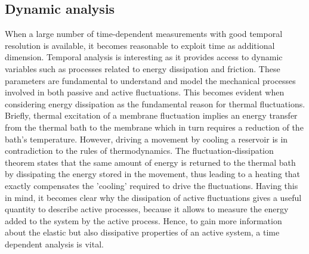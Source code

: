 \documentclass[graybox]{svmult}
\begin{document}
\subsection{Dynamic analysis}
	\label{active}
When a large number of time-dependent measurements with good temporal resolution is available, it becomes reasonable to exploit time as additional dimension. Temporal analysis is interesting as it provides access to dynamic variables such as processes related to energy dissipation and friction. These parameters are fundamental to understand and model the mechanical processes involved in both passive and active fluctuations. This becomes evident when considering energy dissipation as the fundamental reason for thermal fluctuations. Briefly, thermal excitation of a membrane fluctuation implies an energy transfer from the thermal bath to the membrane which in turn requires a reduction of the bath's temperature. However, driving a movement by cooling a reservoir is in contradiction to the rules of thermodynamics. The fluctuation-dissipation theorem states that the same amount of energy is returned to the thermal bath by dissipating the energy stored in the movement, thus leading to a heating that exactly compensates the 'cooling' required to drive the fluctuations. Having this in mind, it becomes clear why the dissipation of active fluctuations gives a useful quantity to describe active processes, because it allows to measure the energy added to the system by the active process. Hence, to gain more information about the elastic but also dissipative properties of an active system, a time dependent analysis is vital. 
\end{document}
